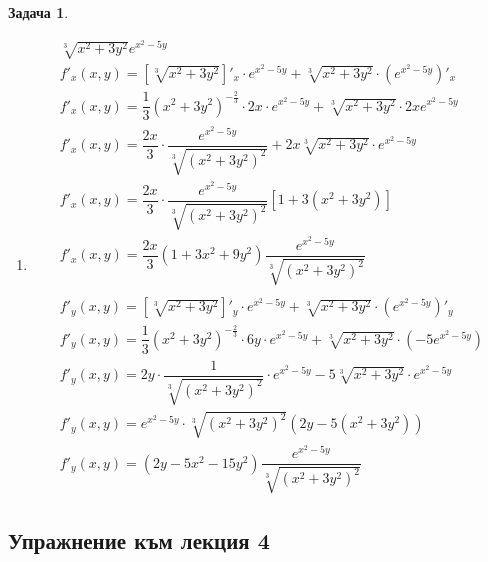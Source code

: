 \documentclass[a4paper,fleqn,12pt]{article}
\newtheorem{task}{Задача}[section]
\begin{document}
\begin{task}
\begin{enumerate}
\begin{gather*}
f(x,y,z) = (xy)^z\\
f'_x(x,y,z) = z(xy)^{z-1} \cdot (xy)'x = yz(xy)^{z-1}\\
f'_y(x,y,z) = z(xy)^{z-1} \cdot (xy)'y = xz(xy)^{z-1}\\
f'_z(x,y,z) = (xy)^z \ln{(xy)}
\end{gather*}
\item 
\begin{gather*}
\sqrt[3]{x^2+3y^2} e^{x^2 - 5y}\\
f'_x(x,y) = \left[ \sqrt[3]{x^2+3y^2} \right]'_x \cdot e^{x^2 - 5y} + \sqrt[3]{x^2+3y^2} \cdot (e^{x^2 - 5y})'_x\\
f'_x(x,y) = \dfrac{1}{3} (x^2 + 3y^2)^{- \frac{2}{3}} \cdot 2x  \cdot e^{x^2 - 5y} +  \sqrt[3]{x^2+3y^2}\cdot 2x e^{x^2 - 5y} \\
f'_x(x,y) = \dfrac{2x}{3} \cdot \dfrac{e^{x^2 - 5y}}{\sqrt[3]{(x^2+3y^2)^2}} + 2x \sqrt[3]{x^2+3y^2} \cdot e^{x^2 - 5y} \\
f'_x(x,y) = \dfrac{2x}{3} \cdot \dfrac{e^{x^2 - 5y}}{\sqrt[3]{(x^2+3y^2)^2}} \left[ 1 + 3(x^2 + 3y^2) \right] \\
f'_x(x,y) = \dfrac{2x}{3} (1 + 3x^2 + 9y^2) \dfrac {e^{x^2 - 5y}}{\sqrt[3]{(x^2+3y^2)^2}}\\
\\
f'_y(x,y) =  \left[ \sqrt[3]{x^2+3y^2} \right]'_y \cdot e^{x^2 - 5y} + \sqrt[3]{x^2+3y^2} \cdot (e^{x^2 - 5y})'_y\\
f'_y(x,y) = \dfrac{1}{3} (x^2 + 3y^2)^{- \frac{2}{3}} \cdot 6y  \cdot e^{x^2 - 5y} +  \sqrt[3]{x^2+3y^2}\cdot (-5e^{x^2 - 5y}) \\
f'_y(x,y) = 2y \cdot \dfrac{1}{\sqrt[3]{(x^2+3y^2)^2}} \cdot e^{x^2 - 5y} - 5  \sqrt[3]{x^2+3y^2}\cdot e^{x^2 - 5y} \\
f'_y(x,y) = e^{x^2 - 5y} \cdot \sqrt[3]{(x^2+3y^2)^2} (2y - 5(x^2 + 3y^2)) \\
f'_y(x,y) = (2y - 5x^2 - 15y^2) \dfrac{e^{x^2 - 5y}}{\sqrt[3]{(x^2+3y^2)^2}}
\end{gather*}
\end{enumerate}
\end{task}

\newpage
\subsection{Упражнение към лекция 4}
\end{document}
